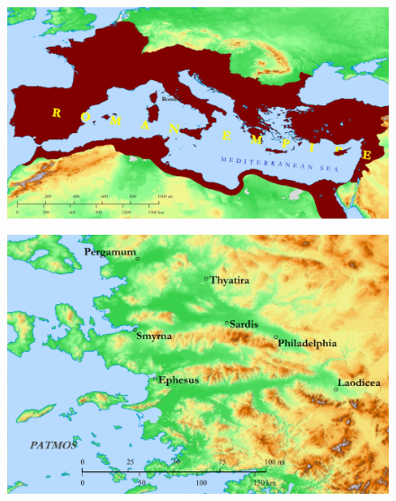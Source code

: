 \cleartoverso
\pagestyle{plain}

\begin{figure}
    \centering
    \includegraphics[width=\paperwidth,height=0.9\paperheight,keepaspectratio]{images/romanempire.jpg}
\end{figure}

\begin{figure}
    \centering
    \includegraphics[width=\paperwidth,height=0.9\paperheight,keepaspectratio]{images/sevenchurches.jpg}
\end{figure}